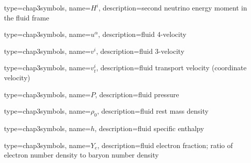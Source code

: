                  {
                   type=chap3symbols,
                   name=$H^i$,
                   description={second neutrino energy moment in the fluid frame}
                 }


                 {
                   type=chap3symbols,
                   name=$u^\alpha$,
                   description={fluid 4-velocity}
                 }


                 {
                   type=chap3symbols,
                   name=$v^i$,
                   description={fluid 3-velocity}
                 }


                 {
                   type=chap3symbols,
                   name=$v_t^i$,
                   description={fluid transport velocity (coordinate velocity)}
                 }

                 {
                   type=chap3symbols,
                   name=$P$,
                   description={fluid pressure}
                 }


                 {
                   type=chap3symbols,
                   name=$\rho_0$,
                   description={fluid rest mass density}
                 }


                 {
                   type=chap3symbols,
                   name=$h$,
                   description={fluid specific enthalpy}
                 }

                 {
                   type=chap3symbols,
                   name=$Y_e$,
                   description={fluid electron fraction; ratio of electron number density to baryon number density}
                 }
